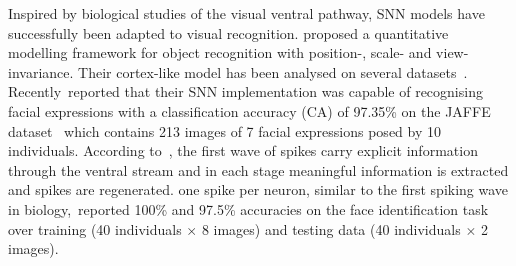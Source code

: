 Inspired by biological studies of the visual ventral pathway, SNN models have successfully been adapted to visual recognition. \DIFdelbegin {}\DIFdelend \DIFaddbegin {}\DIFaddend proposed a quantitative modelling framework for object recognition with position-, scale- and view-invariance.
Their cortex-like model has been analysed on several datasets~\citep{serre2007robust}.
Recently~\DIFdelbegin {}\DIFdelend \DIFaddbegin {}\DIFaddend reported that their SNN implementation was capable of recognising facial expressions with a classification accuracy (CA) of 97.35\% on the JAFFE dataset~\citep{lyons1998coding} which contains 213 images of 7 facial expressions posed by 10 individuals.
According to~\DIFdelbegin {}\DIFdelend \DIFaddbegin {}\DIFaddend , the first wave of spikes carry explicit information through the ventral stream and in each stage meaningful information is extracted and spikes are regenerated. 
\DIFdelbegin {}\DIFdelend \DIFaddbegin {}\DIFaddend one spike per neuron, similar to the first spiking wave in biology,~\DIFdelbegin {}\DIFdelend \DIFaddbegin {}\DIFaddend reported 100\% and 97.5\% accuracies on the face identification task over
training (40 individuals $\times$ 8 images) and testing data (40 individuals $\times$ 2 images).

